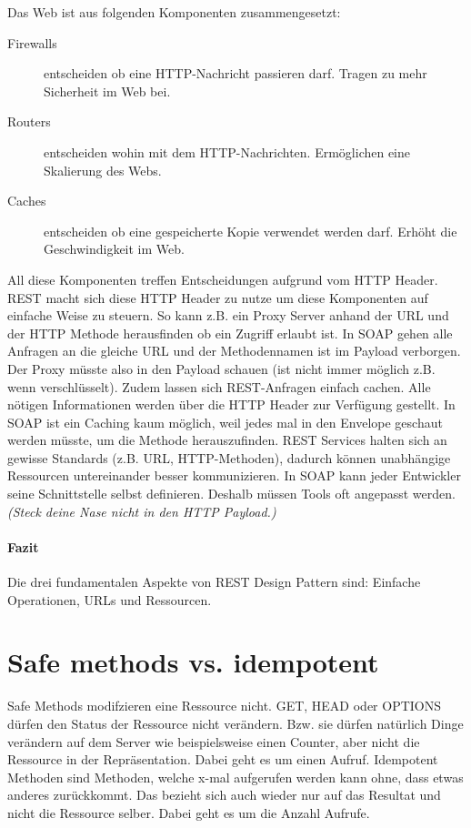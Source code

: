 Das Web ist aus folgenden Komponenten zusammengesetzt:
\begin{description}
	\item[Firewalls] entscheiden ob eine HTTP-Nachricht passieren darf. Tragen zu mehr Sicherheit im Web bei.
	\item[Routers] entscheiden wohin mit dem HTTP-Nachrichten. Ermöglichen eine Skalierung des Webs.
	\item[Caches] entscheiden ob eine gespeicherte Kopie verwendet werden darf. Erhöht die Geschwindigkeit im Web.
\end{description}
All diese Komponenten treffen Entscheidungen aufgrund vom HTTP Header. REST macht sich diese HTTP Header zu nutze um diese Komponenten auf einfache Weise zu steuern. So kann z.B. ein Proxy Server anhand der URL und der HTTP Methode herausfinden ob ein Zugriff erlaubt ist. In SOAP gehen alle Anfragen an die gleiche URL und der Methodennamen ist im Payload verborgen. Der Proxy müsste also in den Payload schauen (ist nicht immer möglich z.B. wenn verschlüsselt).
Zudem lassen sich REST-Anfragen einfach cachen. Alle nötigen Informationen werden über die HTTP Header zur Verfügung gestellt. In SOAP ist ein Caching kaum möglich, weil jedes mal in den Envelope geschaut werden müsste, um die Methode herauszufinden. 
REST Services halten sich an gewisse Standards (z.B. URL, HTTP-Methoden), dadurch können unabhängige Ressourcen untereinander besser kommunizieren. In SOAP kann jeder Entwickler seine Schnittstelle selbst definieren. Deshalb müssen Tools oft angepasst werden. \emph{(Steck deine Nase nicht in den HTTP Payload.)}

\paragraph{Fazit}
Die drei fundamentalen Aspekte von REST Design Pattern sind: Einfache Operationen, URLs und Ressourcen.

\section{Safe methods vs. idempotent}
Safe Methods modifzieren eine Ressource nicht. GET, HEAD oder OPTIONS dürfen den Status der Ressource nicht verändern. Bzw. sie dürfen natürlich Dinge verändern auf dem Server wie beispielsweise einen Counter, aber nicht die Ressource in der Repräsentation. Dabei geht es um einen Aufruf. Idempotent Methoden sind Methoden, welche x-mal aufgerufen werden kann ohne, dass etwas anderes zurückkommt. Das bezieht sich auch wieder nur auf das Resultat und nicht die Ressource selber. Dabei geht es um die Anzahl Aufrufe.

